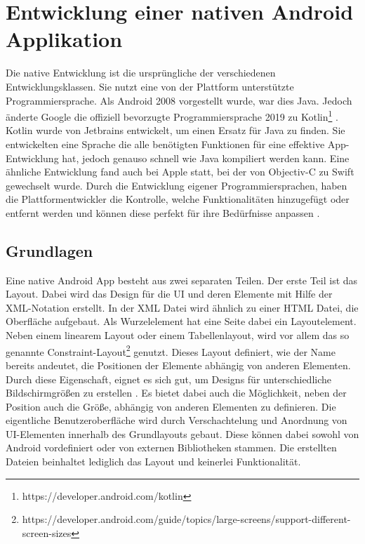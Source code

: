 \section{Entwicklung einer nativen Android Applikation}
Die native Entwicklung ist die ursprüngliche der verschiedenen Entwicklungsklassen. Sie nutzt eine von der Plattform unterstützte Programmiersprache. Als Android 2008 vorgestellt wurde, war dies Java.
Jedoch änderte Google die offiziell bevorzugte Programmiersprache 2019 zu Kotlin\footnote{https://developer.android.com/kotlin} \cite{android_standard}. 
Kotlin wurde von Jetbrains entwickelt, um einen Ersatz für Java zu finden. 
Sie entwickelten eine Sprache die alle benötigten Funktionen für eine effektive App-Entwicklung hat, jedoch genauso schnell wie Java kompiliert werden kann\cite{medium_Swift_Kotlin}. 
Eine ähnliche Entwicklung fand auch bei Apple statt, bei der von Objectiv-C zu Swift gewechselt wurde. 
Durch die Entwicklung eigener Programmiersprachen, haben die Plattformentwickler die Kontrolle, welche Funktionalitäten hinzugefügt oder entfernt werden und können diese perfekt für ihre Bedürfnisse anpassen \cite{medium_Swift_Kotlin}.

\subsection{Grundlagen}
Eine native Android App besteht aus zwei separaten Teilen.
Der erste Teil ist das Layout. Dabei wird das Design für die UI und deren Elemente mit Hilfe der XML-Notation erstellt.
In der XML Datei wird ähnlich zu einer HTML Datei, die Oberfläche aufgebaut. Als Wurzelelement hat eine Seite dabei ein Layoutelement. Neben einem linearem Layout oder einem Tabellenlayout, wird vor allem das so genannte Constraint-Layout\footnote{https://developer.android.com/guide/topics/large-screens/support-different-screen-sizes} genutzt. 
Dieses Layout definiert, wie der Name bereits andeutet, die Positionen der Elemente abhängig von anderen Elementen. Durch diese Eigenschaft, eignet es sich gut, um Designs für unterschiedliche Bildschirmgrößen zu erstellen \cite{ConstraintLayout_Android}. Es bietet dabei auch die Möglichkeit, neben der Position auch die Größe, abhängig von anderen Elementen zu definieren.
Die eigentliche Benutzeroberfläche wird durch Verschachtelung und Anordnung von UI-Elementen innerhalb des Grundlayouts gebaut. Diese können dabei sowohl von Android vordefiniert oder von externen Bibliotheken stammen. Die erstellten Dateien beinhaltet lediglich das Layout und keinerlei Funktionalität.


